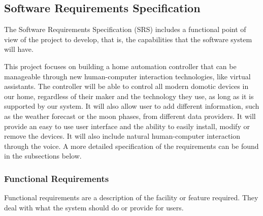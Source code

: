\subsection{Software Requirements Specification}
The Software Requirements Specification (SRS) includes a functional point of view of the project to develop, that is, the capabilities
that the software system will have.

This project focuses on building a home automation controller that can be manageable through new human-computer interaction technologies,
like virtual assistants. The controller will be able to control all modern domotic devices in our home, regardless of their maker and the 
technology they use, as long as it is supported by our system. It will also allow user to add different information, such as the weather 
forecast or the moon phases, from different data providers. It will provide an easy to use user interface and the ability to easily install, 
modify or remove the devices. It will also include natural human-computer interaction through the voice. A more detailed specification 
of the requirements can be found in the subsections below.

\subsubsection{Functional Requirements}
Functional requirements are a description of the facility or feature required. They deal with what the system should do or provide
for users.\cite{sqaFunctionalNonFunctional}


